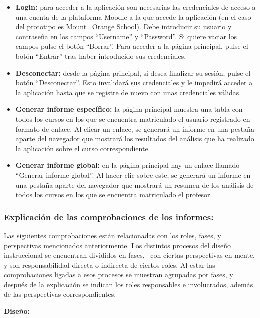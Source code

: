 \begin{itemize}
	\item
	\textbf{Login:} para acceder a la aplicación son necesarias las
	credenciales de acceso a una cuenta de la plataforma Moodle a la que
	accede la aplicación (en el caso del prototipo es Mount ~Orange
	School). Debe introducir su usuario y contraseña en los campos
	``Username'' y ``Password''. Si quiere vaciar los campos pulse el botón
	``Borrar''. Para acceder a la página principal, pulse el botón ``Entrar''
	tras haber introducido sus credenciales.
	\item
	\textbf{Desconectar:} desde la página principal, si desea finalizar su
	sesión, pulse el botón ``Desconectar''. Esto invalidará sus credenciales
	y le impedirá acceder a la aplicación hasta que se registre de nuevo
	con unas credenciales válidas.
	\item
	\textbf{Generar informe específico:} la página principal muestra una
	tabla con todos los cursos en los que se encuentra matriculado el
	usuario registrado en formato de enlace. Al clicar un enlace, se
	generará un informe en una pestaña aparte del navegador que mostrará
	los resultados del análisis que ha realizado la aplicación sobre el
	curso correspondiente.
	\item
	\textbf{Generar informe global:} en la página principal hay un enlace
	llamado ``Generar informe global''. Al hacer clic sobre este, se
	generará un informe en una pestaña aparte del navegador que mostrará
	un resumen de los análisis de todos los cursos en los que se encuentra
	matriculado el profesor.
\end{itemize}

\subsubsection{Explicación de las comprobaciones de los informes:}

Las siguientes comprobaciones están relacionadas con los roles, fases, y
perspectivas mencionados anteriormente. Los distintos procesos del
diseño instruccional se encuentran divididos en fases, ~con ciertas
perspectivas en mente, y son responsabilidad directa o indirecta de
ciertos roles. Al estar las comprobaciones ligadas a esos procesos se
muestran agrupadas por fases, y después de la explicación se indican los
roles responsables e involucrados, además de las perspectivas
correspondientes.

\textbf{Diseño:}

